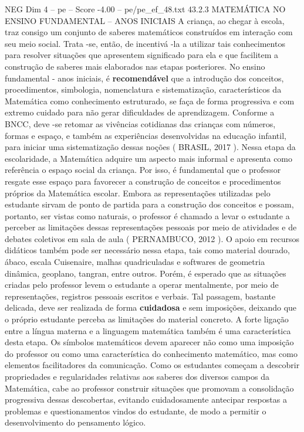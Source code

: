 \begin{textsample}{NEG Dim 4 – pe – Score -4.00 – pe/pe\_ef\_48.txt}  \label{ex:f4_neg_004}
43.2.3 MATEMÁTICA NO ENSINO FUNDAMENTAL – ANOS INICIAIS A criança, ao chegar à escola, traz consigo um conjunto de saberes matemáticos construídos em interação com seu meio social.
Trata -se, então, de incentivá -la a utilizar tais conhecimentos para resolver situações que apresentem significado para ela e que facilitem a construção de saberes mais elaborados nas etapas posteriores.
No ensino fundamental - anos iniciais, é \textbf{recomendável} que a introdução dos conceitos, procedimentos, simbologia, nomenclatura e sistematização, característicos da Matemática como conhecimento estruturado, se faça de forma progressiva e com extremo cuidado para não gerar dificuldades de aprendizagem.
Conforme a BNCC, deve -se retomar as vivências cotidianas das crianças com números, formas e espaço, e também as experiências desenvolvidas na educação infantil, para iniciar uma sistematização dessas noções ( BRASIL, 2017 ).
Nessa etapa da escolaridade, a Matemática adquire um aspecto mais informal e apresenta como referência o espaço social da criança.
Por isso, é fundamental que o professor resgate esse espaço para favorecer a construção de conceitos e procedimentos próprios da Matemática escolar.
Embora as representações utilizadas pelo estudante sirvam de ponto de partida para a construção dos conceitos e possam, portanto, ser vistas como naturais, o professor é chamado a levar o estudante a perceber as limitações dessas representações pessoais por meio de atividades e de debates coletivos em sala de aula ( PERNAMBUCO, 2012 ).
O apoio em recursos didáticos também pode ser necessário nessa etapa, tais como material dourado, ábaco, escala Cuisenaire, malhas quadriculadas e softwares de geometria dinâmica, geoplano, tangran, entre outros.
Porém, é esperado que as situações criadas pelo professor levem o estudante a operar mentalmente, por meio de representações, registros pessoais escritos e verbais.
Tal passagem, bastante delicada, deve ser realizada de forma \textbf{cuidadosa} e sem imposições, deixando que o próprio estudante perceba as limitações do material concreto.
A forte ligação entre a língua materna e a linguagem matemática também é uma característica desta etapa.
Os símbolos matemáticos devem aparecer não como uma imposição do professor ou como uma característica do conhecimento matemático, mas como elementos facilitadores da comunicação.
Como os estudantes começam a descobrir propriedades e regularidades relativas aos saberes dos diversos campos da Matemática, cabe ao professor construir situações que promovam a consolidação progressiva dessas descobertas, evitando cuidadosamente antecipar respostas a problemas e questionamentos vindos do estudante, de modo a permitir o desenvolvimento do pensamento lógico.

\end{textsample}
